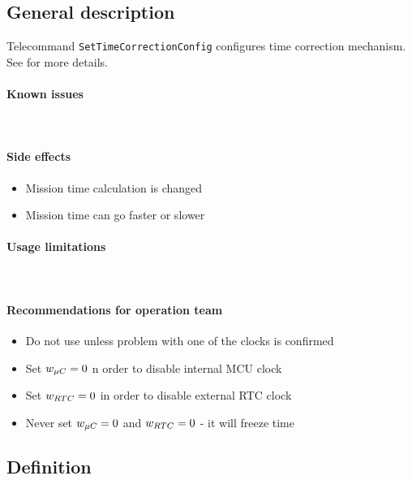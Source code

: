 



\subsection{General description}
Telecommand \texttt{SetTimeCorrectionConfig} configures time correction mechanism. See  for more details.

\paragraph{Known issues} \mbox{} \\
\None

\paragraph{Side effects} 
\begin{itemize}
	\item Mission time calculation is changed
	\item Mission time can go faster or slower
\end{itemize}


\paragraph{Usage limitations} \mbox{} \\
\None

\paragraph{Recommendations for operation team}
\begin{itemize}
	\item Do not use unless problem with one of the clocks is confirmed
	\item Set $w_{\mu C} = 0$ n order to disable internal MCU clock
	\item Set $w_{RTC} = 0$ in order to disable external RTC clock	
	\item Never set $w_{\mu C} = 0$ and $w_{RTC} = 0$  - it will freeze time
\end{itemize}

\subsection{Definition}

